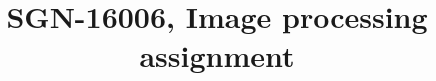 \documentclass{article}
\title{SGN-16006, Image processing assignment}
\begin{document}
\maketitle
\sloppy







\small

\printbibliography{}

\vfill\pagebreak
\end{document}
